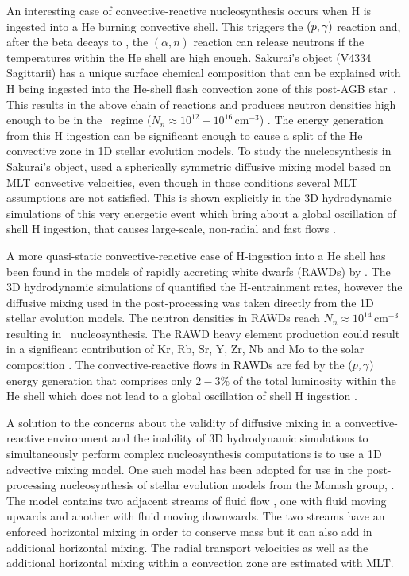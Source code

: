 \documentclass[fleqn,usenatbib]{mnras}
\begin{document}
% 
An interesting case of convective-reactive nucleosynthesis occurs when
H is ingested into a He burning convective shell.  This triggers the
$(p,\gamma)$ reaction and, after the
 beta decays to , the
$(\alpha,n)$ reaction can release neutrons
if the temperatures within the He shell are high enough. Sakurai's
object (V4334 Sagittarii) has a unique surface chemical composition
\citep{asplund:99a} that can be explained with H being ingested into
the He-shell flash convection zone of this post-AGB
star~\citep{herwig:11}. This results in the above chain of reactions
and produces neutron densities high enough to be in the \ipr~regime
($N_{n} \approx 10^{12} - 10^{16}$\,cm$^{-3}$) \citep{cowan:77}. The
energy generation from this H ingestion can be significant enough to
cause a split of the He convective zone in 1D stellar evolution
models. To study the nucleosynthesis in Sakurai's object,
\citet{herwig:11} used a spherically symmetric diffusive mixing model
based on MLT convective velocities, even though in those conditions
several MLT assumptions are not satisfied. This is shown explicitly in the
3D hydrodynamic simulations of this very energetic event which bring
about a global oscillation of shell H ingestion, that causes
large-scale, non-radial and fast flows \citep{Herwig:2014cx}.

A more quasi-static convective-reactive case of H-ingestion into a He
shell has been found in the models of rapidly accreting white dwarfs
(RAWDs) by \cite{Denissenkov:2017ba}. The 3D hydrodynamic simulations
of \citet{Denissenkov:19} quantified the H-entrainment rates, however
the diffusive mixing used in the post-processing was taken directly
from the 1D stellar evolution models. The neutron densities in RAWDs
reach $N_{n} \approx 10^{14}$\,cm$^{-3}$ resulting in
\ipr~nucleosynthesis.  The RAWD heavy element production could result
in a significant contribution of Kr, Rb, Sr, Y, Zr, Nb and Mo to the
solar composition \citep{Cote2018}. The convective-reactive flows in
RAWDs are fed by the $(p,\gamma)$ energy
generation that comprises only $2-3\%$ of the total luminosity within
the He shell which does not lead to a global oscillation of shell H
ingestion \citep{Denissenkov:19}.

A solution to the concerns about the validity of diffusive mixing in a
convective-reactive environment and the inability of 3D hydrodynamic
simulations to simultaneously perform complex nucleosynthesis
computations is to use a 1D advective mixing model.  One such model
has been adopted for use in the post-processing nucleosynthesis of
stellar evolution models from the Monash group, 
\citep{cannon1993, Henkel2017}. The model contains two adjacent
streams of fluid flow \citep[see our  and Fig.~1
  in][]{Henkel2017}, one with fluid moving upwards and another with
fluid moving downwards. The two streams have an enforced horizontal
mixing in order to conserve mass but it can also add in additional
horizontal mixing. The radial transport velocities as well as the
additional horizontal mixing within a convection zone are estimated
with MLT.
\end{document}
